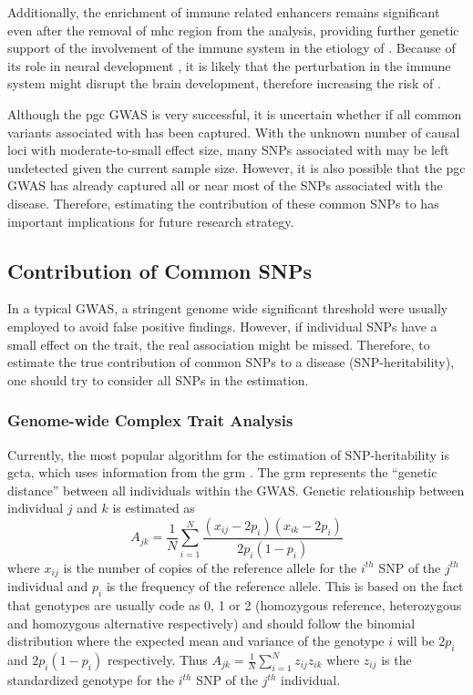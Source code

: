 	Additionally, the enrichment of immune related enhancers remains significant even after the removal of \gls{mhc} region from the analysis, providing further genetic support of the involvement of the immune system in the etiology of .
	Because of its role in neural development \citep{Zhao1998,Deverman2009}, it is likely that the perturbation in the immune system might disrupt the brain development, therefore increasing the risk of .
	
	Although the \gls{pgc}  \gls{GWAS} is very successful, it is uncertain whether if all common variants associated with  has been captured. 
	With the unknown number of causal loci with moderate-to-small effect size, many \glspl{SNP} associated with  may be left undetected given the current sample size. 
	However, it is also possible that the \gls{pgc}  \gls{GWAS} has already captured all or near most of the \glspl{SNP} associated with the disease. 
	Therefore, estimating the contribution of these common \glspl{SNP} to  has important implications for future research strategy.
	
	\subsection{Contribution of Common SNPs}
	In a typical \gls{GWAS}, a stringent genome wide significant threshold were usually employed to avoid false positive findings. 
	However, if individual \glspl{SNP} have a small effect on the trait, the real association might be missed.
	Therefore, to estimate the true contribution of common \glspl{SNP} to a disease (\gls{SNP}-heritability), one should try to consider all \glspl{SNP} in the estimation.
	
	\subsubsection{Genome-wide Complex Trait Analysis}
	Currently, the most popular algorithm for the estimation of \gls{SNP}-heritability is \gls{gcta}, which uses information from the \gls{grm} \citep{Yang2011}.
	The \gls{grm} represents the ``genetic distance'' between all individuals within the \gls{GWAS}.
	Genetic relationship between individual $j$ and $k$ is estimated as 
	\begin{equation}
	A_{jk} = \frac{1}{N}\sum^N_{i=1}\frac{(x_{ij}-2p_i)(x_{ik}-2p_i)}{2p_i(1-p_i)}
	\end{equation}
	where $x_{ij}$ is the number of copies of the reference allele for the $i^{th}$ \gls{SNP} of the $j^{th}$ individual and $p_i$ is the frequency of the reference allele.
	This is based on the fact that genotypes are usually code as 0, 1 or 2 (homozygous reference, heterozygous and homozygous alternative respectively) and should follow the binomial distribution where the expected mean and variance of the genotype $i$ will be $2p_i$ and $2p_i(1-p_i)$ respectively.
	Thus $A_{jk} = \frac{1}{N}\sum^N_{i=1}z_{ij}z_{ik}$ where $z_{ij}$ is the standardized genotype for the $i^{th}$ \gls{SNP} of the $j^{th}$ individual.
	
